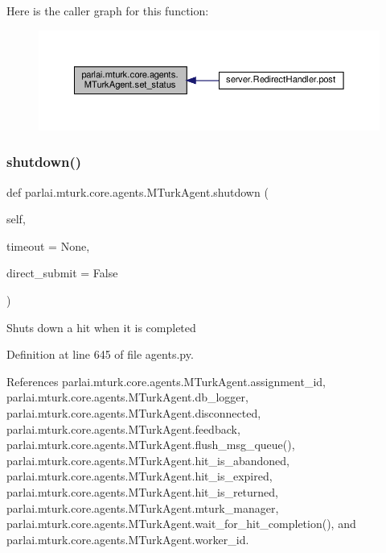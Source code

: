 Here is the caller graph for this function\+:
\nopagebreak
\begin{figure}[H]
\begin{center}
\leavevmode
\includegraphics[width=350pt]{classparlai_1_1mturk_1_1core_1_1agents_1_1MTurkAgent_a59bc035a28a067a5408a2c15f9f94604_icgraph}
\end{center}
\end{figure}
\mbox{\label{classparlai_1_1mturk_1_1core_1_1agents_1_1MTurkAgent_ad269775afaaa10dba0432080fba99b14}} 
\subsubsection{\texorpdfstring{shutdown()}{shutdown()}}
{\footnotesize\ttfamily def parlai.\+mturk.\+core.\+agents.\+M\+Turk\+Agent.\+shutdown (\begin{DoxyParamCaption}\item[{}]{self,  }\item[{}]{timeout = {\ttfamily None},  }\item[{}]{direct\+\_\+submit = {\ttfamily False} }\end{DoxyParamCaption})}

\begin{DoxyVerb}Shuts down a hit when it is completed\end{DoxyVerb}
 

Definition at line 645 of file agents.\+py.



References parlai.\+mturk.\+core.\+agents.\+M\+Turk\+Agent.\+assignment\+\_\+id, parlai.\+mturk.\+core.\+agents.\+M\+Turk\+Agent.\+db\+\_\+logger, parlai.\+mturk.\+core.\+agents.\+M\+Turk\+Agent.\+disconnected, parlai.\+mturk.\+core.\+agents.\+M\+Turk\+Agent.\+feedback, parlai.\+mturk.\+core.\+agents.\+M\+Turk\+Agent.\+flush\+\_\+msg\+\_\+queue(), parlai.\+mturk.\+core.\+agents.\+M\+Turk\+Agent.\+hit\+\_\+is\+\_\+abandoned, parlai.\+mturk.\+core.\+agents.\+M\+Turk\+Agent.\+hit\+\_\+is\+\_\+expired, parlai.\+mturk.\+core.\+agents.\+M\+Turk\+Agent.\+hit\+\_\+is\+\_\+returned, parlai.\+mturk.\+core.\+agents.\+M\+Turk\+Agent.\+mturk\+\_\+manager, parlai.\+mturk.\+core.\+agents.\+M\+Turk\+Agent.\+wait\+\_\+for\+\_\+hit\+\_\+completion(), and parlai.\+mturk.\+core.\+agents.\+M\+Turk\+Agent.\+worker\+\_\+id.

